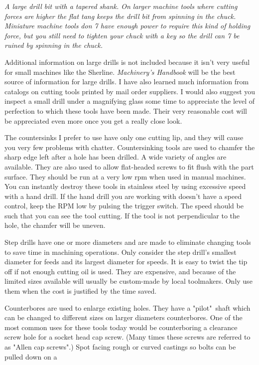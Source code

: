 \bigskip
\textit{A large drill bit with a tapered shank. On larger machine tools where
cutting forces are higher the flat tang keeps the drill bit from spinning in the
chuck. Miniature machine tools don 7 have enough power to require this kind of
holding force, but you still need to tighten your chuck with a key so the drill
can 7 be ruined by spinning in the chuck.}
\bigskip

Additional information on large drills is not included because it isn't very
useful for small machines like the Sherline. \emph{Machinery's Handbook} will be
the best source of information for large drills. I have also learned much
information from catalogs on cutting tools printed by mail order suppliers. I
would also suggest you inspect a small drill under a magnifying glass some time
to appreciate the level of perfection to which these tools have been made. Their
very reasonable cost will be appreciated even more once you get a really close
look.


The countersinks I prefer to use have only one cutting lip, and they will cause
you very few problems with chatter. Countersinking tools are used to chamfer the
sharp edge left after a hole has been drilled. A wide variety of angles are
available. They are also used to allow flat-headed screws to fit flush with the
part surface. They should be run at a very low rpm when used in manual machines.
You can instantly destroy these tools in stainless steel by using excessive
speed with a hand drill. If the hand drill you are working with doesn't have a
speed control, keep the RPM low by pulsing the trigger switch. The speed should
be such that you can see the tool cutting. If the tool is not perpendicular to
the hole, the chamfer will be uneven.


Step drills have one or more diameters and are made to eliminate changing tools
to save time in machining operations. Only consider the step drill's smallest
diameter for feeds and its largest diameter for speeds. It is easy to twist the
tip off if not enough cutting oil is used. They are expensive, and because of
the limited sizes available will usually be custom-made by local toolmakers.
Only use them when the cost is justified by the time saved.


Counterbores are used to enlarge existing holes. They have a "pilot"\ shaft which
can be changed to different sizes on larger diameters counterbores. One of the
most common uses for these tools today would be counterboring a clearance screw
hole for a socket head cap screw. (Many times these screws are referred to as
"Allen cap screws".) Spot facing rough or curved castings so bolts can be pulled
down on a

